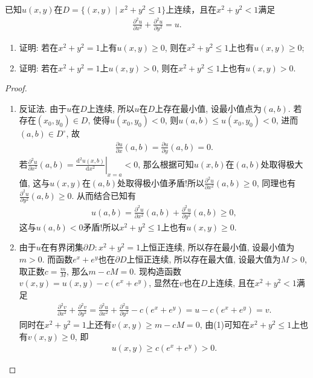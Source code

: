 \documentclass[../../main.tex]{subfiles}%
\begin{document}
\begin{example}
已知$u(x,y)$在$D=\{(x,y)\mid x^2+y^2\leqslant1\}$上连续，且在$x^2+y^2<1$满足
\begin{align*}
\frac{\partial^2 u}{\partial x^2}+\frac{\partial^2 u}{\partial y^2}=u.
\end{align*}
\begin{enumerate}[(1)]
\item 证明: 若在$x^2+y^2=1$上有$u(x,y)\geqslant0$, 则在$x^2+y^2\leqslant1$上也有$u(x,y)\geqslant0$;
\item 证明: 若在$x^2+y^2=1$上$u(x,y)>0$, 则在$x^2+y^2\leqslant1$上也有$u(x,y)>0$.
\end{enumerate}
\end{example}
\begin{proof}
\begin{enumerate}[(1)]
\item 反证法. 由于$u$在$D$上连续, 所以$u$在$D$上存在最小值, 设最小值点为$(a,b)$. 若存在$(x_0,y_0)\in D$, 使得$u(x_0,y_0)<0$, 则$u(a,b)\leqslant u(x_0,y_0)<0$, 进而$(a,b)\in D^\circ$, 故
\begin{align*}
\frac{\partial u}{\partial x}(a,b)=\frac{\partial u}{\partial y}(a,b)=0.
\end{align*}
若$\frac{\partial ^2u}{\partial x^2}\left( a,b \right) =\left.\frac{\mathrm{d}^2u\left( x,b \right)}{\mathrm{d}x^2}\right|_{x=a}<0$, 那么根据可知$u(x,b)$在$(a,b)$处取得极大值, 这与$u(x,y)$在$(a,b)$处取得极小值矛盾!所以$\frac{\partial^2 u}{\partial x^2}(a,b)\geqslant0$, 同理也有$\frac{\partial^2 u}{\partial y^2}(a,b)\geqslant0$. 从而结合已知有
\begin{align*}
u(a,b)=\frac{\partial^2 u}{\partial x^2}(a,b)+\frac{\partial^2 u}{\partial y^2}(a,b)\geqslant0,
\end{align*}
这与$u(a,b)<0$矛盾!所以$x^2+y^2\leqslant1$上也有$u(x,y)\geqslant0$.

\item 由于$u$在有界闭集$\partial D: x^2+y^2=1$上恒正连续, 所以存在最小值, 设最小值为$m>0$. 而函数$e^x+e^y$也在$\partial D$上恒正连续, 所以存在最大值, 设最大值为$M>0$, 取正数$c=\frac{m}{M}$, 那么$m-cM=0$. 现构造函数$v(x,y)=u(x,y)-c(e^x+e^y)$, 显然在$v$也在$D$上连续, 且在$x^2+y^2<1$满足
\begin{align*}
\frac{\partial^2 v}{\partial x^2}+\frac{\partial^2 v}{\partial y^2}
=\frac{\partial^2 u}{\partial x^2}+\frac{\partial^2 u}{\partial y^2}-c(e^x+e^y)
=u-c(e^x+e^y)=v.
\end{align*}
同时在$x^2+y^2=1$上还有$v(x,y)\geqslant m-cM=0$, 由(1)可知在$x^2+y^2\leqslant1$上也有$v(x,y)\geqslant0$, 即
\begin{align*}
u(x,y)\geqslant c(e^x+e^y)>0.
\end{align*}
\end{enumerate}
\end{proof}
\end{document}
